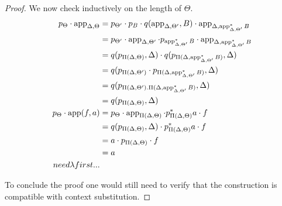 \documentclass[a4paper,fontsize=12pt]{scrartcl}
\begin{document}
\begin{proof}
  We now check inductively on the length of $\Theta$. 
  \begin{align*}
    p_{\Theta}\cdot\operatorname{app}_{\Delta,\Theta}
    &=p_{\Theta'}\cdot
    p_B\cdot
    q(\operatorname{app}_{\Delta,\Theta'},B)\cdot
    \operatorname{app}_{\Delta,\operatorname{app}^*_{\Delta,\Theta'}B} \\
    &=p_{\Theta'}\cdot
    \operatorname{app}_{\Delta,\Theta'}\cdot
    p_{\operatorname{app}^*_{\Delta,\Theta'}B}\cdot
    \operatorname{app}_{\Delta,\operatorname{app}^*_{\Delta,\Theta'}B} \\
    &=q(p_{\Pi(\Delta,\Theta)},\Delta)\cdot
    q(p_{\Pi(\Delta,\operatorname{app}^*_{\Delta,\Theta'}B)},\Delta) \\
    &=q(p_{\Pi(\Delta,\Theta')}\cdot
    p_{\Pi(\Delta,\operatorname{app}^*_{\Delta,\Theta'}B)},\Delta) \\
    &=q(p_{\Pi(\Delta,\Theta').\Pi(\Delta,\operatorname{app}^*_{\Delta,\Theta'}B)},\Delta) \\
    &=q(p_{\Pi(\Delta,\Theta)},\Delta) \\
    p_\Theta\cdot\operatorname{app}(f,a)
    &=p_\Theta\cdot\operatorname{app}_{\Pi(\Delta,\Theta)}\cdot p^*_{\Pi(\Delta,\Theta)}a\cdot f \\
    &=q(p_{\Pi(\Delta,\Theta)},\Delta)\cdot p^*_{\Pi(\Delta,\Theta)}a\cdot f \\
    &=a\cdot p_{\Pi(\Delta,\Theta)}\cdot f \\
    &=a \\
    need \lambda first...
  \end{align*}

  To conclude the proof one would still need to verify that the construction is
  compatible with context substitution.
\end{proof}
\end{document}
